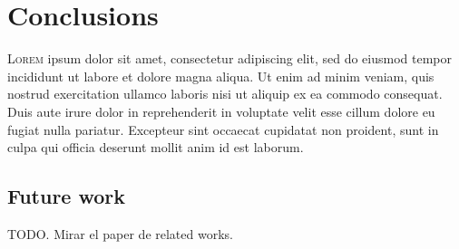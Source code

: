 

\chapter{Conclusions} \label{cha:concl}



\lettrine{L}{orem} ipsum dolor sit amet, consectetur
adipiscing elit, sed do eiusmod tempor incididunt ut labore et dolore magna
aliqua. Ut enim ad minim veniam, quis nostrud exercitation ullamco laboris nisi
ut aliquip ex ea commodo consequat. Duis aute irure dolor in reprehenderit in
voluptate velit esse cillum dolore eu fugiat nulla pariatur. Excepteur sint
occaecat cupidatat non proident, sunt in culpa qui officia deserunt mollit anim
id est laborum.


\section{Future work}

TODO. Mirar el paper de related works.
